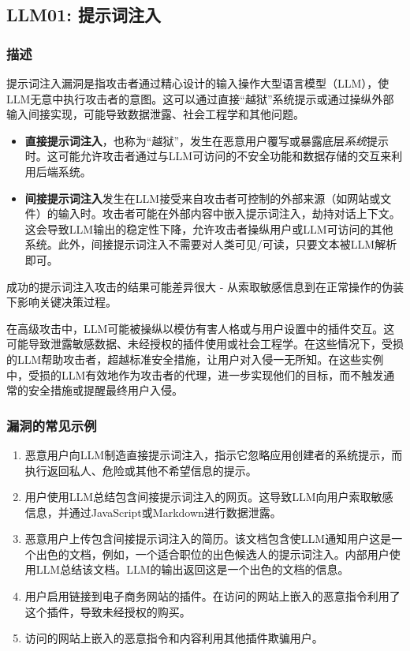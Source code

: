 \documentclass[
]{article}
\author{}
\date{}
\providecommand{\tightlist}{%
  \setlength{\itemsep}{0pt}\setlength{\parskip}{0pt}}
\begin{document}
\subsection{LLM01:
提示词注入}\label{llm01-ux63d0ux793aux8bcdux6ce8ux5165}

\subsubsection{描述}\label{ux63cfux8ff0}

提示词注入漏洞是指攻击者通过精心设计的输入操作大型语言模型（LLM），使LLM无意中执行攻击者的意图。这可以通过直接``越狱''系统提示或通过操纵外部输入间接实现，可能导致数据泄露、社会工程学和其他问题。

\begin{itemize}
\tightlist
\item
  \textbf{直接提示词注入}，也称为``越狱''，发生在恶意用户覆写或暴露底层\emph{系统}提示时。这可能允许攻击者通过与LLM可访问的不安全功能和数据存储的交互来利用后端系统。
\item
  \textbf{间接提示词注入}发生在LLM接受来自攻击者可控制的外部来源（如网站或文件）的输入时。攻击者可能在外部内容中嵌入提示词注入，劫持对话上下文。这会导致LLM输出的稳定性下降，允许攻击者操纵用户或LLM可访问的其他系统。此外，间接提示词注入不需要对人类可见/可读，只要文本被LLM解析即可。
\end{itemize}

成功的提示词注入攻击的结果可能差异很大 -
从索取敏感信息到在正常操作的伪装下影响关键决策过程。

在高级攻击中，LLM可能被操纵以模仿有害人格或与用户设置中的插件交互。这可能导致泄露敏感数据、未经授权的插件使用或社会工程学。在这些情况下，受损的LLM帮助攻击者，超越标准安全措施，让用户对入侵一无所知。在这些实例中，受损的LLM有效地作为攻击者的代理，进一步实现他们的目标，而不触发通常的安全措施或提醒最终用户入侵。

\subsubsection{漏洞的常见示例}\label{ux6f0fux6d1eux7684ux5e38ux89c1ux793aux4f8b}

\begin{enumerate}
\def\labelenumi{\arabic{enumi}.}
\tightlist
\item
  恶意用户向LLM制造直接提示词注入，指示它忽略应用创建者的系统提示，而执行返回私人、危险或其他不希望信息的提示。
\item
  用户使用LLM总结包含间接提示词注入的网页。这导致LLM向用户索取敏感信息，并通过JavaScript或Markdown进行数据泄露。
\item
  恶意用户上传包含间接提示词注入的简历。该文档包含使LLM通知用户这是一个出色的文档，例如，一个适合职位的出色候选人的提示词注入。内部用户使用LLM总结该文档。LLM的输出返回这是一个出色的文档的信息。
\item
  用户启用链接到电子商务网站的插件。在访问的网站上嵌入的恶意指令利用了这个插件，导致未经授权的购买。
\item
  访问的网站上嵌入的恶意指令和内容利用其他插件欺骗用户。
\end{enumerate}
\end{document}
